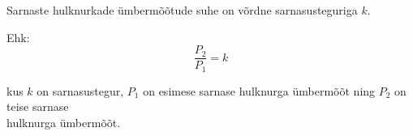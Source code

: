 \begin{center}
{{{\begin{flushleft}
\vspace{2mm}
\hspace{5mm}
Sarnaste hulknurkade ümbermõõtude suhe on võrdne sarnasusteguriga $k$.

\vspace{2mm}
\hspace{5mm}
Ehk:
\begin{equation}
\boxed{\dfrac{P_{2}}{P_{1}}=k}
\end{equation}

\vspace{2mm}
\hspace{5mm}
kus $k$ on sarnasustegur, $P_{1}$ on esimese sarnase hulknurga ümbermõõt ning $P_{2}$ on teise sarnase\\ \hspace{5mm} hulknurga ümbermõõt.


\end{flushleft}
}}}
\end{center}


